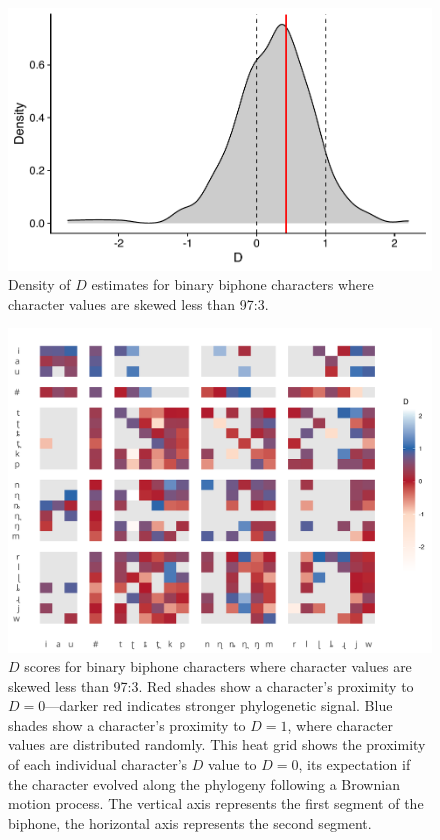 \begin{figure}[tbp]

{\centering \includegraphics[width=0.66\linewidth]{05-phylo-signal/fig/d-density-filtered} 

}

\caption[Density of $D$ estimates for binary biphone characters, highly skewed characters removed]{Density of $D$ estimates for binary biphone characters where character values are skewed less than 97:3.}\label{fig:d-density-filtered}
\end{figure}

\begin{figure}[tbp]

{\centering \includegraphics[width=0.75\linewidth]{05-phylo-signal/fig/d-swatch-filtered} 

}

\caption[$D$ scores for binary biphone characters, highly skewed characters removed]{$D$ scores for binary biphone characters where character values are skewed less than 97:3. Red shades show a character's proximity to $D=0$---darker red indicates stronger phylogenetic signal. Blue shades show a character's proximity to $D=1$, where character values are distributed randomly. This heat grid shows the proximity of each individual character's $D$ value to $D=0$, its expectation if the character evolved along the phylogeny following a Brownian motion process. The vertical axis represents the first segment of the biphone, the horizontal axis represents the second segment.}\label{fig:d-swatch-filtered}
\end{figure}

